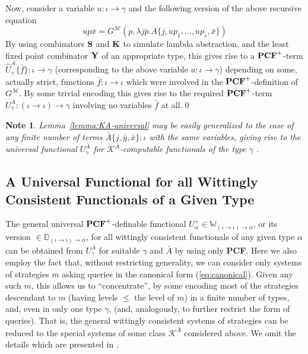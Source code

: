 \documentclass[fleqn]{LMCS}
\theoremstyle{plain}\newtheorem{satz}[thm]{Satz}
\theoremstyle{plain}\newtheorem{hyp}[thm]{Hypothesis}
\theoremstyle{plain}\newtheorem{hyps}[thm]{Hypotheses}
\theoremstyle{definition}\newtheorem{note}[thm]{Note}
\newcommand{\setof}[1]{\{#1\}}
\newcommand{\arr}{\rightarrow}
\newcommand{\G}{G}
\newcommand{\tbbW}{\mathbb{W}}\newcommand{\bbD}{\mathbb{D}}
\newcommand{\PCF}{\mbox{\bf PCF}}
\newcommand{\K}{\mbox{\bf K}}
\newcommand{\Ss}{\mbox{\bf S}}
\newcommand{\Y}{\mbox{\bf Y}}
\newcommand{\KbarA}{{\mathcal K}^{\bar{A}}}
\newcommand{\MM}{{\mathcal M}}
\newcommand{\bx}{\bar{x}}
\newcommand{\?}{\mbox{?}}
\begin{document}
Now, consider a variable $u:\iota\arr\gamma$ and the following 
version of the above recursive equation 
\begin{equation}\label{eq:den-sem-w-special-u}
up\bx=
G^{\MM}(p,\lambda j\bar{p}.
{A\{j,up_1,\ldots,up_s,\bx \}})
\end{equation}
By using combinators $\Ss$ and $\K$ to simulate lambda abstraction, and 
the least fixed point combinator $\Y$ of an appropriate type, 
this gives rise to a $\PCF^+$-term 
$\hat{U}^A_{\gamma}\setof{\bar{f}}:\iota\arr\gamma$ 
(corresponding to the above variable $u:\iota\arr\gamma$)
depending on some, actually strict, functions $\bar{f}:\iota\arr\iota$ which 
were involved in the $\PCF^+$-definition of $\G^{\MM}$. 
By some trivial encoding this gives rise to the required 
$\PCF^+$-term $U^A_{\gamma}:(\iota\arr\iota)\arr\gamma$ 
involving no variables $\bar{f}$ at all.\qed


\begin{note}\em
Lemma~\ref{lemma:KA-universal} may be easily generalized to the case 
of any finite number of terms $\bar{A}\setof{j,\bar{y},\bx }:\iota$ 
with the same variables, giving rise to the universal functional 
$U^{\bar{A}}_{\gamma}$ for $\KbarA$-computable functionals 
of the type $\gamma$ . 
\end{note}


\subsection{A Universal Functional for all Wittingly Consistent 
Functionals of a Given Type}
\label{sec:univ-wittingly-consis}

\noindent
The general universal $\PCF^+$-definable functional 
$U^+_{\alpha}\in\tbbW_{(\iota\arr\iota)\arr\alpha}$, or its version 
$\in \bbD_{(\iota\arr\iota)\arr\alpha}$, for all wittingly consistent 
functionals of any given type $\alpha$
can be obtained from $U^{\bar{A}}_{\gamma}$ for suitable $\gamma$ 
and $\bar{A}$ by using only \PCF. 
Here we also employ the fact that, without restricting generality, 
we can consider only systems of strategies $m$ asking queries 
in the canonical form (\ref{eq:canonical}). 
Given any such $m$, this allows us to ``concentrate'', by some encoding 
most of the strategies descendant to $m$ 
(having levels $\le$ the level of $m$) 
in a finite number of types, and, even in only one type $\gamma$, 
(and, analogously, to further restrict 
the form of queries). That is, the general wittingly 
consistent systems of strategies can be 
reduced to the special systems of some class $\KbarA$ considered above. 
We omit the details which are presented in \cite{Saz76AL}. 
\end{document}
